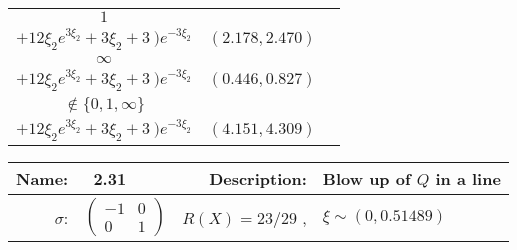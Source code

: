 {\begin{tabularx}{\textwidth}{|c|c|c}
\(1\) & \begin{tabular}{l} \(\frac{1}{3\xi_2^{4}} \cdot
 ( \ (2   \xi_2^{3} - 3   \xi_2 - 3) e^{4   \xi_2} \)   \\ \hspace{2cm} \(+12 \xi_2 e^{3 \xi_2} + 3 \xi_2 + 3 \ ) e^{-3 \xi_2}\) \end{tabular} & \((2.178,2.470)\) \\ \midrule
\(\infty\) & \begin{tabular}{l} \(\frac{1}{3\xi_2^{4}} \cdot
 ( \ (2   \xi_2^{3} - 3   \xi_2 - 3) e^{4   \xi_2} \)   \\ \hspace{2cm} \(+12 \xi_2 e^{3 \xi_2} + 3 \xi_2 + 3 \ ) e^{-3 \xi_2}\) \end{tabular} & \((0.446,0.827)\) \\ \midrule
\(\notin \{0,1,\infty\}\) & \begin{tabular}{l} \(\frac{1}{3\xi_2^{4}} \cdot
 ( \ (2   \xi_2^{3} - 3   \xi_2 - 3) e^{4   \xi_2} \)   \\ \hspace{2cm} \(+12 \xi_2 e^{3 \xi_2} + 3 \xi_2 + 3 \ ) e^{-3 \xi_2}\) \end{tabular} & \((4.151,4.309)\) \\
 \bottomrule
\end{tabularx}
\newpage
%
%
%
%
%
%
%
\begin{tabularx}{\textwidth}{rlrl}
\toprule
\textbf{Name:} & \ 2.31 \hspace{0.3\textwidth} & \textbf{Description:} & Blow up of $Q$ in a line\\
\midrule
\textbf{$\sigma$}: & {\small $\begin{pmatrix} -1 & 0 \\ 0 & 1 \end{pmatrix}$ } & $ R(X) = 23/29$ , & $\xi \sim (0,0.51489)$
\end{tabularx}

}
